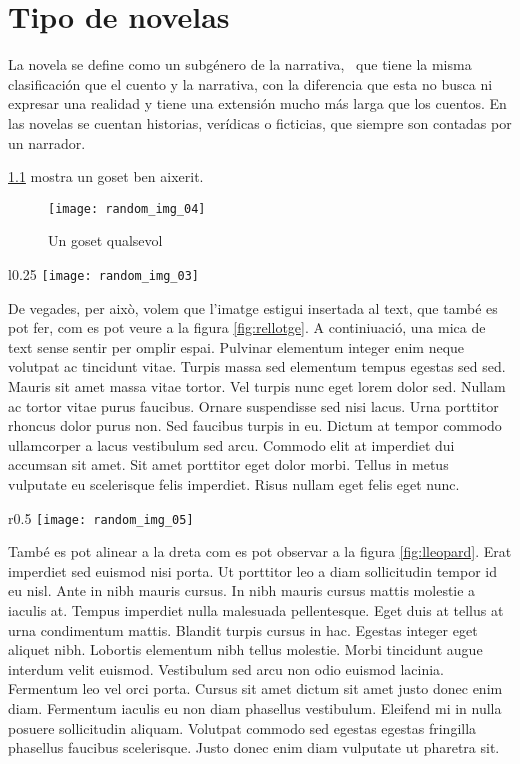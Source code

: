 \chapter{Tipo de novelas}
\label{cap:primer}La novela se define como un subgénero de la narrativa,  que tiene la misma clasificación que el cuento y la narrativa, con la diferencia que esta no busca ni expresar una realidad y tiene una extensión mucho más larga que los cuentos. En las novelas se cuentan historias, verídicas o ficticias, que siempre son contadas por un narrador.

 \ref{fig:gos} mostra un goset ben aixerit.
\begin{figure}[h]
    \centering
    \texttt{[image: random\_img\_04]}
    \caption{Un goset qualsevol}
    \label{fig:gos}
\end{figure}

\begin{wrapfigure}{l}{0.25\textwidth}
    \centering
    \texttt{[image: random\_img\_03]}
    \caption{El temps vola}
    \label{fig:rellotge}
\end{wrapfigure}

De vegades, per això, volem que l'imatge estigui insertada al text, que també es pot fer, com es pot veure a la figura \ref{fig:rellotge}. A continiuació, una mica de text sense sentir per omplir espai. Pulvinar elementum integer enim neque volutpat ac tincidunt vitae. Turpis massa sed elementum tempus egestas sed sed. Mauris sit amet massa vitae tortor. Vel turpis nunc eget lorem dolor sed. Nullam ac tortor vitae purus faucibus. Ornare suspendisse sed nisi lacus. Urna porttitor rhoncus dolor purus non. Sed faucibus turpis in eu. Dictum at tempor commodo ullamcorper a lacus vestibulum sed arcu. Commodo elit at imperdiet dui accumsan sit amet. Sit amet porttitor eget dolor morbi. Tellus in metus vulputate eu scelerisque felis imperdiet. Risus nullam eget felis eget nunc.

\begin{wrapfigure}{r}{0.5\textwidth}
    \centering
    \texttt{[image: random\_img\_05]}
    \caption{El lleopard}
    \label{fig:lleopard}
\end{wrapfigure}
També es pot alinear a la dreta com es pot observar a la figura \ref{fig:lleopard}. Erat imperdiet sed euismod nisi porta. Ut porttitor leo a diam sollicitudin tempor id eu nisl. Ante in nibh mauris cursus. In nibh mauris cursus mattis molestie a iaculis at. Tempus imperdiet nulla malesuada pellentesque. Eget duis at tellus at urna condimentum mattis. Blandit turpis cursus in hac. Egestas integer eget aliquet nibh. Lobortis elementum nibh tellus molestie. Morbi tincidunt augue interdum velit euismod. Vestibulum sed arcu non odio euismod lacinia. Fermentum leo vel orci porta. Cursus sit amet dictum sit amet justo donec enim diam. Fermentum iaculis eu non diam phasellus vestibulum. Eleifend mi in nulla posuere sollicitudin aliquam. Volutpat commodo sed egestas egestas fringilla phasellus faucibus scelerisque. Justo donec enim diam vulputate ut pharetra sit.

